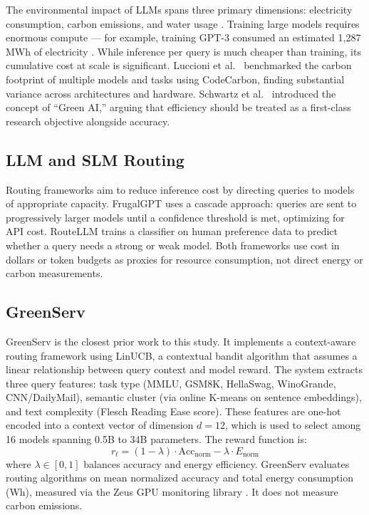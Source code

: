 \documentclass[12pt]{article}
\begin{document}
The environmental impact of LLMs spans three primary dimensions: electricity
consumption, carbon emissions, and water usage \cite{luccioni2023,
strubell2019}. Training large models requires enormous compute --- for
example, training GPT-3 consumed an estimated 1,287 MWh of electricity
\cite{patterson2021}. While inference per query is much cheaper than
training, its cumulative cost at scale is significant. Luccioni et al.\
\cite{luccioni2023hf} benchmarked the carbon footprint of multiple models
and tasks using CodeCarbon, finding substantial variance across architectures
and hardware. Schwartz et al.\ \cite{schwartz2020green} introduced the
concept of ``Green AI,'' arguing that efficiency should be treated as a
first-class research objective alongside accuracy.

\subsection{LLM and SLM Routing}

Routing frameworks aim to reduce inference cost by directing queries to
models of appropriate capacity. FrugalGPT \cite{chen2023frugalgpt} uses a
cascade approach: queries are sent to progressively larger models until a
confidence threshold is met, optimizing for API cost. RouteLLM
\cite{routellm2024} trains a classifier on human preference data to predict
whether a query needs a strong or weak model. Both frameworks use cost in
dollars or token budgets as proxies for resource consumption, not direct
energy or carbon measurements.

\subsection{GreenServ}

GreenServ \cite{ziller2026} is the closest prior work to this study. It
implements a context-aware routing framework using LinUCB, a contextual
bandit algorithm that assumes a linear relationship between query context and
model reward. The system extracts three query features: task type (MMLU,
GSM8K, HellaSwag, WinoGrande, CNN/DailyMail), semantic cluster (via online
K-means on sentence embeddings), and text complexity (Flesch Reading Ease
score). These features are one-hot encoded into a context vector of dimension
$d = 12$, which is used to select among 16 models spanning 0.5B to 34B
parameters. The reward function is:
\begin{equation}
r_t = (1 - \lambda) \cdot \text{Acc}_\text{norm} - \lambda \cdot E_\text{norm}
\end{equation}
where $\lambda \in [0,1]$ balances accuracy and energy efficiency.
GreenServ evaluates routing algorithms on mean normalized accuracy and total
energy consumption (Wh), measured via the Zeus GPU monitoring library
\cite{zeus2023}. It does not measure carbon emissions.
\end{document}

